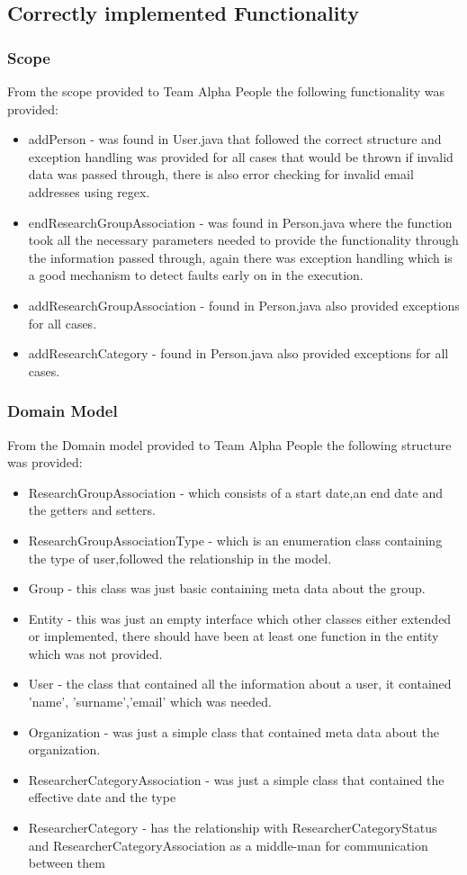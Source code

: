 \documentclass{article}
\begin{document}
	\subsection{Correctly implemented Functionality}
	\subsubsection{Scope}
	From the scope provided to Team Alpha People the following functionality was provided:
	\begin{itemize}
		\item addPerson - was found in User.java that followed the correct structure and exception handling was provided for all cases that would be thrown if invalid data was passed through, there is also error checking for invalid email addresses using regex.
		\item endResearchGroupAssociation - was found in Person.java where the function took all the necessary parameters needed to provide the functionality through the information passed through, again there was exception handling which is a good mechanism to detect faults early on in the execution.
		\item addResearchGroupAssociation - found in Person.java also provided exceptions for all cases.
		\item addResearchCategory - found in Person.java also provided exceptions for all cases.
		
	\end{itemize}
	
	\subsubsection{Domain Model}
	From the Domain model provided to Team Alpha People the following structure was provided:
	\begin{itemize}
	 \item ResearchGroupAssociation - which consists of a start date,an end date and the getters and setters.
	 \item ResearchGroupAssociationType - which is an enumeration class containing the type of user,followed the relationship in the model.
	 \item Group - this class was just basic containing meta data about the group.
	 \item Entity - this was just an empty interface which other classes either extended or implemented, there should have been at least one function in the entity which was not provided.
	 \item User - the class that contained all the information about a user, it contained 'name', 'surname','email' which was needed.
	 \item Organization - was just a simple class that contained meta data about the organization.
	 \item ResearcherCategoryAssociation - was just a simple class that contained the effective date and the type
	 \item ResearcherCategory - has the relationship with ResearcherCategoryStatus and ResearcherCategoryAssociation as a middle-man for communication between them
	 
	\end{itemize}
\end{document}
